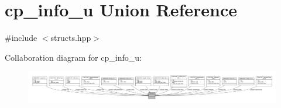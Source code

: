 \hypertarget{unioncp__info__u}{\section{cp\+\_\+info\+\_\+u Union Reference}
\label{unioncp__info__u}
}


{\ttfamily \#include $<$structs.\+hpp$>$}



Collaboration diagram for cp\+\_\+info\+\_\+u\+:\nopagebreak
\begin{figure}[H]
\begin{center}
\leavevmode
\includegraphics[width=350pt]{unioncp__info__u__coll__graph}
\end{center}
\end{figure}
